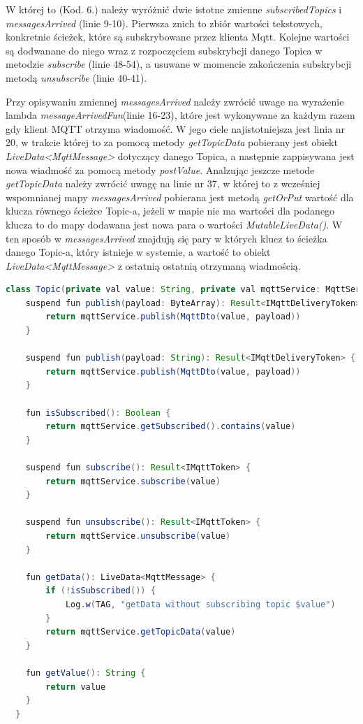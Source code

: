  W której to (Kod. 6.) należy wyróżnić dwie istotne zmienne \textit{subscribedTopics} i \textit{messagesArrived} (linie 9-10). Pierwsza znich to zbiór wartości tekstowych, konkretnie ścieżek, które są subskrybowane przez klienta Mqtt. Kolejne wartości są dodwanane do niego wraz z rozpoczęciem subskrybcji danego Topica w metodzie \textit{subscribe} (linie 48-54), a usuwane w momencie zakończenia subskrybcji metodą \textit{unsubscribe} (linie 40-41).

 Przy opisywaniu zmiennej \textit{messagesArrived} należy zwrócić uwage na wyrażenie lambda \textit{messageArrivedFun}(linie 16-23), które jest wykonywane za każdym razem gdy klient MQTT otrzyma wiadomość. W jego ciele najistotniejsza jest linia nr 20, w trakcie której to za pomocą metody \textit{getTopicData} pobierany jest obiekt \textit{LiveData<MqttMessage>} dotyczący danego Topica, a następnie zappisywana jest nowa wiadmość za pomocą metody \textit{postValue}. Analzując jeszcze metode \textit{getTopicData} należy zwrócić uwagę na linie nr 37, w której to z wcześniej wspomnianej mapy \textit{messagesArrived} pobierana jest metodą \textit{getOrPut} wartość dla klucza równego ścieżce Topic-a, jeżeli w mapie nie ma wartości dla podanego klucza to do mapy dodawana jest nowa para o wartości \textit{MutableLiveData()}. W ten sposób w \textit{messagesArrived} znajdują się pary w których klucz to ścieżka danego Topic-a, który istnieje w systemie, a wartość to obiekt \textit{LiveData<MqttMessage>} z ostatnią ostatnią otrzymaną wiadmością.



 \begin{lstlisting}[language=Java, caption=Klasa wewnętrzna \textit{Topic}]
  class Topic(private val value: String, private val mqttService: MqttService) {
    suspend fun publish(payload: ByteArray): Result<IMqttDeliveryToken> {
        return mqttService.publish(MqttDto(value, payload))
    }
  
    suspend fun publish(payload: String): Result<IMqttDeliveryToken> {
        return mqttService.publish(MqttDto(value, payload))
    }
  
    fun isSubscribed(): Boolean {
        return mqttService.getSubscribed().contains(value)
    }
  
    suspend fun subscribe(): Result<IMqttToken> {
        return mqttService.subscribe(value)
    }
  
    suspend fun unsubscribe(): Result<IMqttToken> {
        return mqttService.unsubscribe(value)
    }
  
    fun getData(): LiveData<MqttMessage> {
        if (!isSubscribed()) {
            Log.w(TAG, "getData without subscribing topic $value")
        }
        return mqttService.getTopicData(value)
    }
  
    fun getValue(): String {
        return value
    }
  }
  
  \end{lstlisting}




